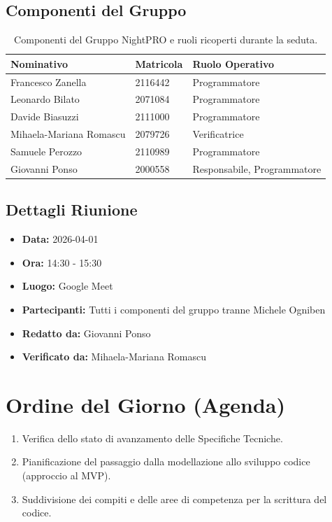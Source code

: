 \documentclass[a4paper, 11pt, oneside]{scrartcl} %
\begin{document}
\subsection{Componenti del Gruppo}
\begin{table}[h!]
\centering
\begin{tabular}{@{}lll@{}}
\toprule
\textbf{Nominativo} & \textbf{Matricola} & \textbf{Ruolo Operativo} \\
\midrule
Francesco Zanella & 2116442 & Programmatore \\
Leonardo Bilato & 2071084 & Programmatore \\
Davide Biasuzzi & 2111000 & Programmatore \\
Mihaela-Mariana Romascu & 2079726 & Verificatrice \\
Samuele Perozzo & 2110989 & Programmatore \\
Giovanni Ponso & 2000558 & Responsabile, Programmatore \\
\bottomrule
\end{tabular}
\caption{Componenti del Gruppo NightPRO e ruoli ricoperti durante la seduta.}
\end{table}

\subsection{Dettagli Riunione}
\begin{itemize}
    \item \textbf{Data:} 2026-04-01
    \item \textbf{Ora:} 14:30 - 15:30
    \item \textbf{Luogo:} Google Meet
    \item \textbf{Partecipanti:} Tutti i componenti del gruppo tranne Michele Ogniben
    \item \textbf{Redatto da:} Giovanni Ponso
    \item \textbf{Verificato da:} Mihaela-Mariana Romascu
\end{itemize}

\newpage
\section{Ordine del Giorno (Agenda)}
\begin{enumerate}
    \item Verifica dello stato di avanzamento delle Specifiche Tecniche.
    \item Pianificazione del passaggio dalla modellazione allo sviluppo codice (approccio al MVP).
    \item Suddivisione dei compiti e delle aree di competenza per la scrittura del codice.
\end{enumerate}
\end{document}
